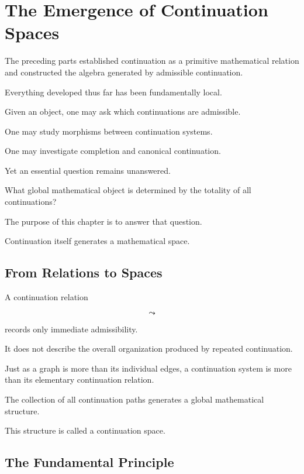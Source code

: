 \documentclass[13pt,openany]{book}
\theoremstyle{plain}
\theoremstyle{definition}
\begin{document}
\chapter{The Emergence of Continuation Spaces}

The preceding parts established continuation as a primitive mathematical
relation and constructed the algebra generated by admissible continuation.

Everything developed thus far has been fundamentally local.

Given an object, one may ask which continuations are admissible.

One may study morphisms between continuation systems.

One may investigate completion and canonical continuation.

Yet an essential question remains unanswered.

What global mathematical object is determined by the totality of all
continuations?

The purpose of this chapter is to answer that question.

Continuation itself generates a mathematical space.


\section{From Relations to Spaces}

A continuation relation

\[
\leadsto
\]

records only immediate admissibility.

It does not describe the overall organization produced by repeated
continuation.

Just as a graph is more than its individual edges, a continuation system is more
than its elementary continuation relation.

The collection of all continuation paths generates a global mathematical
structure.

This structure is called a continuation space.


\section{The Fundamental Principle}
\end{document}
